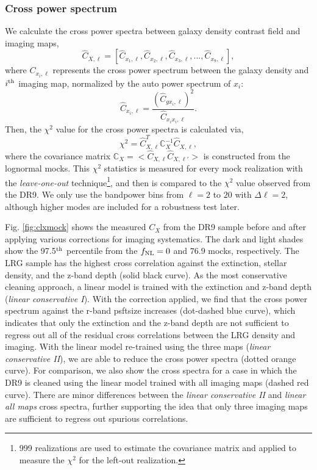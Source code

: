 \subsubsection{Cross power spectrum}
We calculate the cross power spectra between galaxy density contrast field and imaging maps,
\begin{equation}
\hat{C}_{X, \ell} = [\hat{C}_{x_{1}, \ell}, \hat{C}_{x_{2}, \ell}, \hat{C}_{x_{3}, \ell}, ..., \hat{C}_{x_{9}, \ell}],
\end{equation}
where $C_{x_{i}, \ell}$ represents the cross power spectrum between the galaxy density and $i^{\rm th}$ imaging map, normalized by the auto power spectrum of $x_{i}$:
\begin{equation}
\hat{C}_{x_{i}, \ell} = \frac{(\hat{C}_{gx_{i}, \ell})^{2}}{\hat{C}_{x_{i}x_{i},\ell}}.
\end{equation}
Then, the $\chi^{2}$ value for the cross power spectra is calculated via,
\begin{equation}
\chi^{2} = \hat{C}^{T}_{X, \ell} \mathbb{C}_{X}^{-1} \hat{C}_{X, \ell},
\end{equation}
where the covariance matrix $\mathbb{C}_{X} = < \hat{C}_{X, \ell} \hat{C}_{X, \ell'} >$ is constructed from the lognormal mocks. This $\chi^{2}$ statistics is measured for every mock realization with the \textit{leave-one-out} technique\footnote{999 realizations are used to estimate the covariance matrix and applied to measure the $\chi^{2}$ for the left-out realization.}, and then is compared to the $\chi^{2}$ value observed from the DR9. We only use the bandpower bins from $\ell=2$ to $20$ with $\Delta\ell=2$, although higher modes are included for a robustness test later. 

Fig. \ref{fig:clxmock} shows the measured $C_{X}$ from the DR9 sample before and after applying various corrections for imaging systematics. The dark and light shades show the 97.5$^{\rm th}$ percentile from the $f_{\rm NL}=0$ and $76.9$ mocks, respectively. The LRG sample has the highest cross correlation against the extinction, stellar density, and the z-band depth (solid black curve). As the most conservative cleaning approach, a linear model is trained with the extinction and z-band depth (\textit{linear conservative I}). With the correction applied, we find that the cross power spectrum against the r-band psftsize increases (dot-dashed blue curve), which indicates that only the extinction and the z-band depth are not sufficient to regress out all of the residual cross correlations between the LRG density and imaging. With the linear model re-trained using the three maps (\textit{linear conservative II}), we are able to reduce the cross power spectra (dotted orange curve). For comparison, we also show the cross spectra for a case in which the DR9 is cleaned using the linear model trained with all imaging maps (dashed red curve). There are minor differences between the \textit{linear conservative II} and \textit{linear all maps} cross spectra, further supporting the idea that only three imaging maps are sufficient to regress out spurious correlations.

